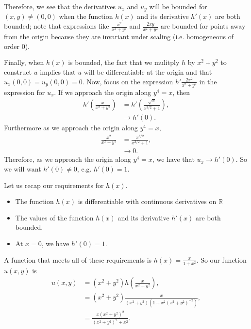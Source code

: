 Therefore, we see that the derivatives \(u_x\) and \(u_y\) will be bounded for \((x,y) \neq (0,0)\) when the function \(h(x)\) and its derivative \(h'(x)\) are both bounded; note that expressions like
\(\frac{x^2}{x^2 + y^2}\) and \(\frac{2xy}{x^2 + y^2}\) are bounded for points away from the origin because they are invariant under scaling (i.e. homogeneous of order 0).

Finally, when \(h(x)\) is bounded, the fact that we mulitply \(h\) by \(x^2 + y^2\) to construct \(u\) implies that \(u\) will be differentiable at the origin and that \(u_x(0,0) = u_y(0,0) = 0\).
Now, focus on the expression \(h' \frac{2x^2}{x^2 + y^2}\) in the expression for \(u_x\). If we approach the origin along \(y^4 = x\), then
\begin{align}
h'\left(\frac{x}{x^2 + y^2}\right) & = h'\left(\frac{\sqrt{x}}{x^{3/2} + 1}\right) ,\\
    & \to h'(0).
\end{align} 
Furthermore as we approach the origin along \(y^4 = x\), 
\begin{align}
\frac{x^2}{x^2 + y^2} & = \frac{x^{3/2}}{x^{3/2} + 1}, \\
    & \to 0. 
\end{align}
Therefore, as we approach the origin along \(y^4 = x\), we have that \(u_x \to h'(0)\). So we will want \(h'(0) \neq 0\), e.g. \(h'(0) = 1\).

Let us recap our requirements for \(h(x)\).
\begin{itemize}
\item The function \(h(x)\) is differentiable with continuous derivatives on \(\mathbb R\)
\item The values of the function \(h(x)\) and its derivative \(h'(x)\) are both bounded.
\item At \(x = 0\), we have \(h'(0) = 1\).
\end{itemize}

A function that meets all of these requirements is \(h(x) = \frac{x}{1 + x^2}\). So our function \(u(x,y)\) is
\begin{align}
u(x,y) & = (x^2 + y^2) h\left(\frac{x}{x^2 + y^2}\right), \\
    & = (x^2 + y^2) \frac{x}{(x^2+y^2)(1 + x^2 (x^2 + y^2)^{-2})}, \\
    & = \frac{x(x^2 + y^2)^2}{(x^2 + y^2)^2 + x^2}.
\end{align}
